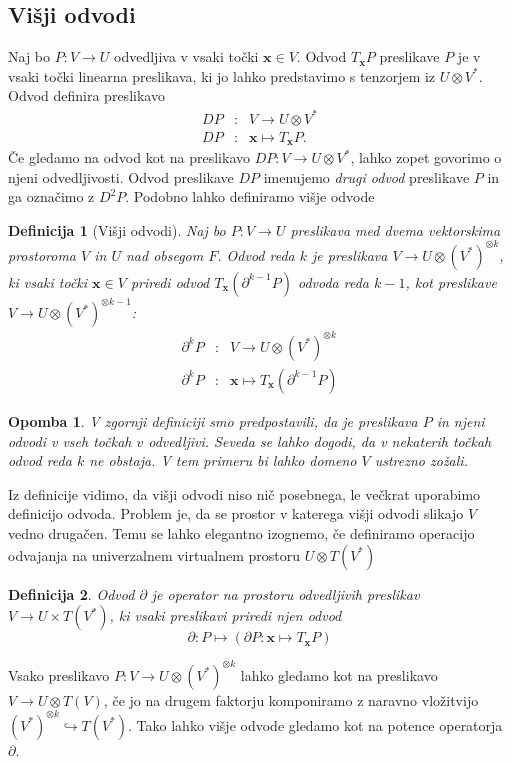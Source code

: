 \documentclass{article}
\newcommand{\x}{\mathbf{x}}
\newtheorem{definicija}{Definicija}[section]
\newtheorem{opomba}{Opomba}[section]
\begin{document}
\subsection{Višji odvodi}
Naj bo $P:V\to U$ odvedljiva v vsaki točki $\x\in V$. Odvod $T_\x P$ preslikave $P$ je v
vsaki točki linearna preslikava, ki jo lahko predstavimo s tenzorjem iz
$U\otimes V^*$. Odvod definira preslikavo 
\begin{eqnarray}
  \label{eq:odvod_preslikava}
  DP&:& V\to U\otimes V^*\\
  DP&:& \x \mapsto T_\x P.
\end{eqnarray}
Če gledamo na odvod kot na preslikavo $DP:V\to U\otimes V^*$, lahko zopet govorimo
o njeni odvedljivosti. Odvod preslikave $DP$ imenujemo \emph{drugi odvod}
preslikave $P$ in ga označimo z $D^2P$. Podobno lahko definiramo višje odvode

\begin{definicija}[Višji odvodi]
  Naj bo $P:V\to U$ preslikava med dvema vektorskima prostoroma $V$ in $U$ nad
  obsegom $F$. Odvod reda $k$ je preslikava $V\to U\otimes(V^*)^{\otimes k}$, ki
  vsaki točki $\x\in V$ priredi odvod $T_\x(\partial^{k-1}P)$ odvoda reda $k-1$, kot
  preslikave $V\to U\otimes (V^*)^{\otimes k-1}$:
  \begin{eqnarray}\label{eq:partial}
    \label{eq:visji_odvod}
    \partial^kP&:&V\to U\otimes (V^*)^{\otimes k}\\
    \partial^kP&:&\x\mapsto T_\x\left( \partial^{k-1}P \right)
  \end{eqnarray}
\end{definicija} 
\begin{opomba}
   V zgornji definiciji smo predpostavili, da je preslikava $P$ in njeni odvodi v
  vseh točkah $v$ odvedljivi. Seveda se lahko dogodi, da v nekaterih točkah
  odvod reda $k$ ne obstaja. V tem primeru bi lahko domeno $V$ ustrezno zožali.
\end{opomba}

Iz definicije vidimo, da višji odvodi niso nič posebnega, le večkrat uporabimo
definicijo odvoda. Problem je, da se prostor v katerega višji odvodi slikajo $V$
vedno drugačen. Temu se lahko elegantno izognemo, če definiramo operacijo
odvajanja na univerzalnem virtualnem prostoru $U\otimes T(V^*)$
\begin{definicija}\label{def:partial}
  Odvod
  $\partial$ je operator na prostoru odvedljivih preslikav $V\to U\times T(V^*)$, ki vsaki preslikavi
  priredi njen odvod
  \begin{equation}
    \label{eq:odvod_splosen}
    \partial : P \mapsto (\partial P:\x\mapsto T_\x P)
  \end{equation}
\end{definicija}
Vsako preslikavo $P:V\to U\otimes (V^*)^{\otimes k}$ lahko gledamo kot na
preslikavo $V\to U\otimes T(V)$, če jo na drugem faktorju komponiramo z naravno vložitvijo $(V^*)^{\otimes k}\hookrightarrow T(V^*)$. Tako lahko višje odvode gledamo kot
na potence operatorja $\partial$. 
\end{document}
